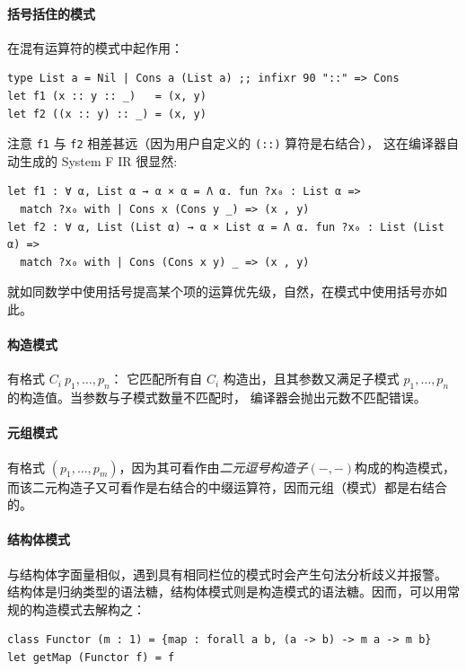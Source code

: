 \paragraph*{括号括住的模式} 在混有运算符的模式中起作用：
\begin{verbatim}
type List a = Nil | Cons a (List a) ;; infixr 90 "::" => Cons
let f1 (x :: y :: _)   = (x, y)
let f2 ((x :: y) :: _) = (x, y)
\end{verbatim}
注意 \texttt{f1} 与 \texttt{f2} 相差甚远（因为用户自定义的 \texttt{(::)} 算符是右结合），
这在编译器自动生成的 \Tigris System F IR 很显然:
\begin{verbatim}
let f1 : ∀ α, List α → α × α = Λ α. fun ?x₀ : List α =>
  match ?x₀ with | Cons x (Cons y _) => (x , y)
let f2 : ∀ α, List (List α) → α × List α = Λ α. fun ?x₀ : List (List α) =>
  match ?x₀ with | Cons (Cons x y) _ => (x , y)
\end{verbatim}
就如同数学中使用括号提高某个项的运算优先级，自然，在模式中使用括号亦如此。
{\setlength{\parskip}{-1em}
  \paragraph*{构造模式} 有格式 \(C_i\ p_1,\dots,p_n\)：
  它匹配所有自 \(C_i\) 构造出，且其参数又满足子模式 \(p_1,\dots,p_n\) 的构造值。当参数与子模式数量不匹配时，
  编译器会抛出元数不匹配错误。
  \paragraph*{元组模式} 有格式 $(p_1,\dots, p_m)$，因为其可看作由\emph{二元逗号构造子}$(-,-)$构成的构造模式，
  而该二元构造子又可看作是右结合的中缀运算符，因而元组（模式）都是右结合的。
  \paragraph*{结构体模式} 与结构体字面量相似，遇到具有相同栏位的模式时会产生句法分析歧义并报警。
  结构体是归纳类型的语法糖，结构体模式则是构造模式的语法糖。因而，可以用常规的构造模式去解构之：
}
\begin{verbatim}
class Functor (m : 1) = {map : forall a b, (a -> b) -> m a -> m b}
let getMap (Functor f) = f
\end{verbatim}

